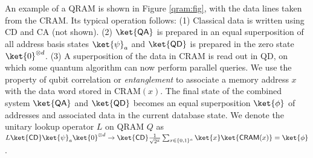\documentclass{toc}
\theoremstyle{plain}
\theoremstyle{definition}
\begin{document}
{An example of a QRAM is shown in Figure \ref{qram:fig}, with the data lines
taken from the \textsf{CRAM}. Its typical operation follows:
(1) Classical data is written
using \textsf{CD} and \textsf{CA} (not shown). (2) $\ket{\textsf{QA}}$ is
prepared in an equal superposition of all address basis states $\ket{\psi}_a$
and $\ket{\textsf{QD}}$ is
prepared in the zero state $\ket{0}^{\otimes d}$.
(3) A superposition of the data in \textsf{CRAM} is read out in
\textsf{QD}, on which some quantum algorithm can now perform parallel
queries. We use the property of qubit correlation or
\textit{entanglement} to associate a memory address $x$ with the data word
stored in \textsf{CRAM}$(x)$.
The final state of the combined system $\ket{\textsf{QA}}$ and
$\ket{\textsf{QD}}$ becomes an equal superposition $\ket{\phi}$
of addresses and associated data in the current
database state.
We denote the unitary lookup operator $L$ on QRAM $Q$ as
$L\ket{\textsf{CD}}\ket{\psi}_a\ket{0}^{\otimes d} \rightarrow
\ket{\textsf{CD}}\frac{1}{\sqrt{2^a}}\sum_{x \in \{0,1\}^a}\ket{x}\ket{\textsf{CRAM}(x)} = \ket{\phi}$.

}
\end{document}
